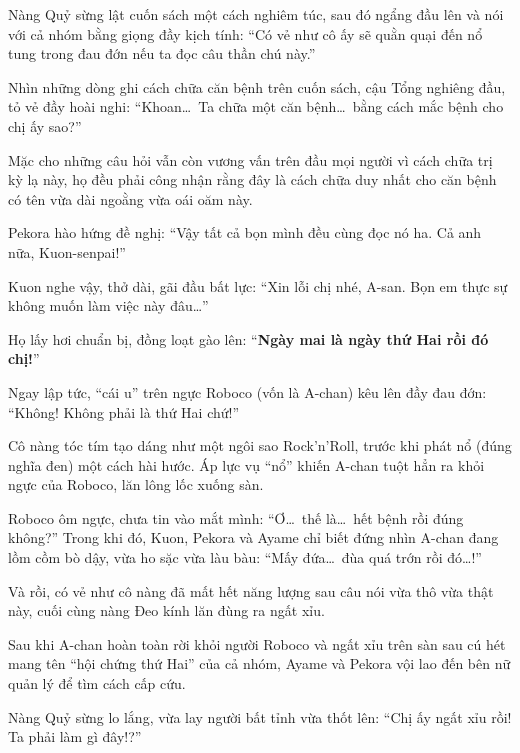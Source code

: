 \documentclass[../main.tex]{subfiles}
\begin{document}
Nàng Quỷ sừng lật cuốn sách một cách nghiêm túc, sau đó ngẩng đầu lên và nói với cả nhóm bằng giọng đầy kịch tính: ``Có vẻ như cô ấy sẽ quằn quại đến nổ tung trong đau đớn nếu ta đọc câu thần chú này.''


Nhìn những dòng ghi cách chữa căn bệnh trên cuốn sách, cậu Tổng nghiêng đầu, tỏ vẻ đầy hoài nghi: ``Khoan\dots\ Ta chữa một căn bệnh\dots\ bằng cách mắc bệnh cho chị ấy sao?''

Mặc cho những câu hỏi vẫn còn vương vấn trên đầu mọi người vì cách chữa trị kỳ lạ này, họ đều phải công nhận rằng đây là cách chữa duy nhất cho căn bệnh có tên vừa dài ngoằng vừa oái oăm này.

Pekora hào hứng đề nghị: ``Vậy tất cả bọn mình đều cùng đọc nó ha. Cả anh nữa, Kuon-senpai!''

Kuon nghe vậy, thở dài, gãi đầu bất lực: ``Xin lỗi chị nhé, A-san. Bọn em thực sự không muốn làm việc này đâu\dots''

Họ lấy hơi chuẩn bị, đồng loạt gào lên: ``\textbf{Ngày mai là ngày thứ Hai rồi đó chị!}''

Ngay lập tức, ``cái u'' trên ngực Roboco (vốn là A-chan) kêu lên đầy đau đớn: ``Không! Không phải là thứ Hai chứ!''

Cô nàng tóc tím tạo dáng như một ngôi sao Rock'n'Roll, trước khi phát nổ (đúng nghĩa đen) một cách hài hước. Áp lực vụ ``nổ'' khiến A-chan tuột hẳn ra khỏi ngực của Roboco, lăn lông lốc xuống sàn.


Roboco ôm ngực, chưa tin vào mắt mình: ``Ơ\dots\ thế là\dots\ hết bệnh rồi đúng không?'' Trong khi đó, Kuon, Pekora và Ayame chỉ biết đứng nhìn A-chan đang lồm cồm bò dậy, vừa ho sặc vừa làu bàu: ``Mấy đứa\dots\ đùa quá trớn rồi đó\dots!''

Và rồi, có vẻ như cô nàng đã mất hết năng lượng sau câu nói vừa thô vừa thật này, cuối cùng nàng Đeo kính lăn đùng ra ngất xỉu.

\omk

Sau khi A-chan hoàn toàn rời khỏi người Roboco và ngất xỉu trên sàn sau cú hét mang tên ``hội chứng thứ Hai'' của cả nhóm, Ayame và Pekora vội lao đến bên nữ quản lý để tìm cách cấp cứu.


Nàng Quỷ sừng lo lắng, vừa lay người bất tỉnh vừa thốt lên: ``Chị ấy ngất xỉu rồi! Ta phải làm gì đây!?''
\end{document}
